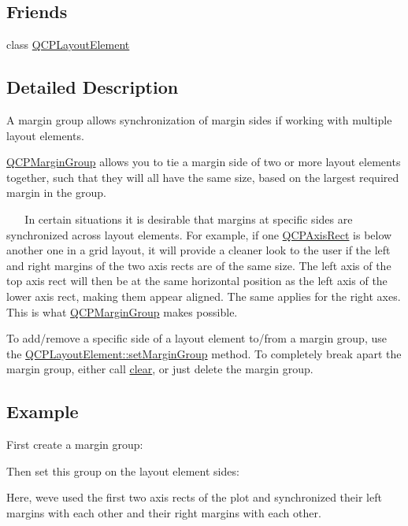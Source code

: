 \subsection*{Friends}
\begin{DoxyCompactItemize}
\item 
class \hyperlink{classQCPMarginGroup_a0790750c7e7f14fdbd960d172655b42b}{Q\+C\+P\+Layout\+Element}
\end{DoxyCompactItemize}


\subsection{Detailed Description}
A margin group allows synchronization of margin sides if working with multiple layout elements. 

\hyperlink{classQCPMarginGroup}{Q\+C\+P\+Margin\+Group} allows you to tie a margin side of two or more layout elements together, such that they will all have the same size, based on the largest required margin in the group.

~\newline
~\newline
 In certain situations it is desirable that margins at specific sides are synchronized across layout elements. For example, if one \hyperlink{classQCPAxisRect}{Q\+C\+P\+Axis\+Rect} is below another one in a grid layout, it will provide a cleaner look to the user if the left and right margins of the two axis rects are of the same size. The left axis of the top axis rect will then be at the same horizontal position as the left axis of the lower axis rect, making them appear aligned. The same applies for the right axes. This is what \hyperlink{classQCPMarginGroup}{Q\+C\+P\+Margin\+Group} makes possible.

To add/remove a specific side of a layout element to/from a margin group, use the \hyperlink{classQCPLayoutElement_a516e56f76b6bc100e8e71d329866847d}{Q\+C\+P\+Layout\+Element\+::set\+Margin\+Group} method. To completely break apart the margin group, either call \hyperlink{classQCPMarginGroup_a144b67f216e4e86c3a3a309e850285fe}{clear}, or just delete the margin group.\hypertarget{classQCPMarginGroup_QCPMarginGroup-example}{}\subsection{Example}\label{classQCPMarginGroup_QCPMarginGroup-example}
First create a margin group\+: 
\begin{DoxyCodeInclude}
\end{DoxyCodeInclude}
Then set this group on the layout element sides\+: 
\begin{DoxyCodeInclude}
\end{DoxyCodeInclude}
Here, we\textquotesingle{}ve used the first two axis rects of the plot and synchronized their left margins with each other and their right margins with each other. 

